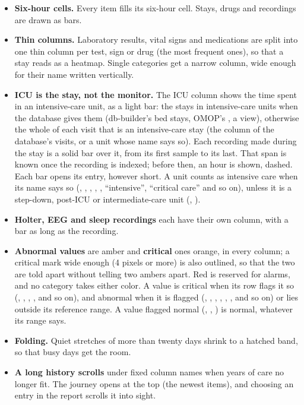 \begin{itemize}
\item \textbf{Six-hour cells.} Every item fills its six-hour cell. Stays, drugs and recordings
  are drawn as bars.
\item \textbf{Thin columns.} Laboratory results, vital signs and medications are split into one
  thin column per test, sign or drug (the most frequent ones), so that a stay reads as a
  heatmap. Single categories get a narrow column, wide enough for their name written
  vertically.
\item \textbf{ICU is the stay, not the monitor.} The ICU column shows the time spent in an
  intensive-care unit, as a light bar: the stays in intensive-care units when the database gives
  them (db-builder's bed stays, OMOP's , a  view), otherwise the
  whole of each visit that is an intensive-care stay (the  column of the database's
  visits, or a unit whose name says so). Each recording made during the
  stay is a solid bar over it, from its first sample to its last. That span is known once the
  recording is indexed; before then, an hour is shown, dashed. Each bar opens its entry, however
  short. A unit counts as intensive care when its name says so (, ,
  , , , ``intensive'', ``critical care'' and so on), unless it is
  a step-down, post-ICU or intermediate-care unit (, ).
\item \textbf{Holter, EEG and sleep recordings} each have their own column, with a bar as long
  as the recording.
\item \textbf{Abnormal values} are amber and \textbf{critical} ones orange, in every column; a
  critical mark wide enough (4 pixels or more) is also outlined, so that the two are told apart
  without telling two ambers apart. Red is reserved for alarms, and no category takes either
  color. A value is critical when its row
  flags it so (, , , ,  and so on), and
  abnormal when it is flagged (, , , , ,
  ,  and so on) or lies outside its reference range. A value
  flagged normal (, , ) is normal, whatever its range says.
\item \textbf{Folding.} Quiet stretches of more than twenty days shrink to a hatched band, so
  that busy days get the room.
\item \textbf{A long history scrolls} under fixed column names when years of care no longer
  fit. The journey opens at the top (the newest items), and choosing an entry in the report
  scrolls it into sight.
\end{itemize}

